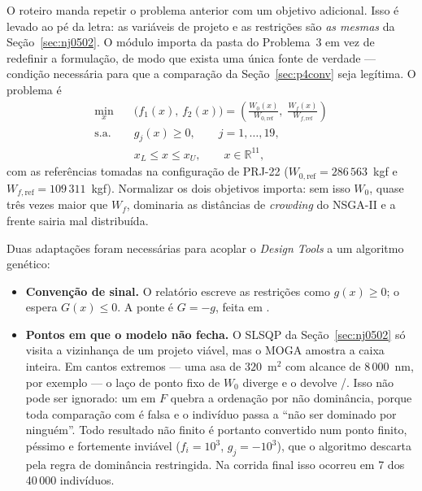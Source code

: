 O roteiro manda repetir o problema anterior com um objetivo adicional.
Isso é levado ao pé da letra: as variáveis de projeto e as restrições são
\emph{as mesmas} da Seção~\ref{sec:nj0502}. O módulo
 importa  da pasta do Problema~3
em vez de redefinir a formulação, de modo que exista uma única fonte de
verdade --- condição necessária para que a comparação da
Seção~\ref{sec:p4conv} seja legítima. O problema é
\begin{equation}
\begin{aligned}
\min_{x}\quad & \big(f_1(x),\, f_2(x)\big)
              = \left(\frac{W_0(x)}{W_{0,\mathrm{ref}}},\;
                      \frac{W_f(x)}{W_{f,\mathrm{ref}}}\right) \\
\text{s.a.}\quad & g_j(x) \ge 0, \qquad j = 1,\ldots,19, \\
                 & x_L \le x \le x_U, \qquad x \in \mathbb{R}^{11},
\end{aligned}
\label{eq:p4}
\end{equation}
com as referências tomadas na configuração de PRJ-22
($W_{0,\mathrm{ref}} = 286\,563$~kgf e $W_{f,\mathrm{ref}} =
109\,311$~kgf). Normalizar os dois objetivos importa: sem isso $W_0$,
quase três vezes maior que $W_f$, dominaria as distâncias de
\emph{crowding} do NSGA-II e a frente sairia mal distribuída.

Duas adaptações foram necessárias para acoplar o \emph{Design Tools} a um
algoritmo genético:

\begin{itemize}
\item \textbf{Convenção de sinal.} O relatório escreve as restrições como
      $g(x)\ge 0$; o  espera $G(x)\le 0$. A ponte é
      $G = -g$, feita em .

\item \textbf{Pontos em que o modelo não fecha.} O SLSQP da
      Seção~\ref{sec:nj0502} só visita a vizinhança de um projeto viável,
      mas o MOGA amostra a caixa inteira. Em cantos extremos --- uma asa
      de $320$~m$^2$ com alcance de $8\,000$~nm, por exemplo --- o laço de
      ponto fixo de $W_0$ diverge e o  devolve
      /. Isso não pode ser ignorado: um  em
      $F$ quebra a ordenação por não dominância, porque toda comparação
      com  é falsa e o indivíduo passa a ``não ser dominado por
      ninguém''. Todo resultado não finito é portanto convertido num
      ponto finito, péssimo e fortemente inviável
      ($f_i = 10^3$, $g_j = -10^3$), que o algoritmo descarta pela regra
      de dominância restringida. Na corrida final isso ocorreu em
      7 dos 40\,000 indivíduos.
\end{itemize}

